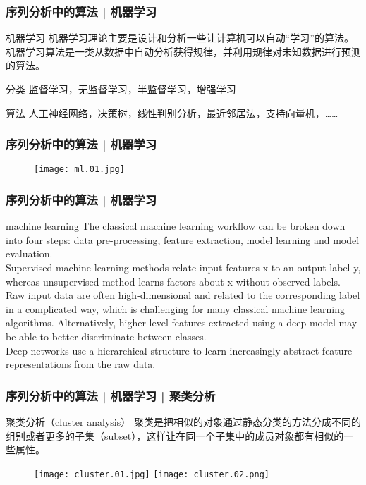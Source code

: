 \begin{frame}
  \frametitle{序列分析中的算法 | 机器学习}
  \begin{block}{机器学习}
    机器学习理论主要是设计和分析一些让计算机可以自动“学习”的算法。机器学习算法是一类从数据中自动分析获得规律，并利用规律对未知数据进行预测的算法。
  \end{block}
  \pause
  \begin{block}{分类}
    监督学习，无监督学习，半监督学习，增强学习
  \end{block}
  \pause
  \begin{block}{算法}
    人工神经网络，决策树，线性判别分析，最近邻居法，支持向量机，……
  \end{block}
\end{frame}

\begin{frame}
  \frametitle{序列分析中的算法 | 机器学习}
  \begin{figure}
    \centering
    \texttt{[image: ml.01.jpg]}
  \end{figure}
\end{frame}

\begin{frame}
  \frametitle{序列分析中的算法 | 机器学习}
  \begin{block}{machine learning}
    The classical machine learning workflow can be broken down into four steps: data pre-processing, feature extraction, model learning and model evaluation.\\
    \vspace{0.5em}
    Supervised machine learning methods relate input features x to an output label y, whereas unsupervised method learns factors about x without observed labels.\\
    \vspace{0.5em}
    Raw input data are often high-dimensional and related to the corresponding label in a complicated way, which is challenging for many classical machine learning algorithms. Alternatively, higher-level features extracted using a deep model may be able to better discriminate between classes.\\
    \vspace{0.5em}
    Deep networks use a hierarchical structure to learn increasingly abstract feature representations from the raw data.
  \end{block}
\end{frame}

\begin{frame}
  \frametitle{序列分析中的算法 | 机器学习 | 聚类分析}
  \begin{block}{聚类分析（cluster analysis）}
    聚类是把相似的对象通过静态分类的方法分成不同的组别或者更多的子集（subset），这样让在同一个子集中的成员对象都有相似的一些属性。
  \end{block}
  \begin{figure}
    \centering
    \texttt{[image: cluster.01.jpg]}
    \texttt{[image: cluster.02.png]}
  \end{figure}
\end{frame}

